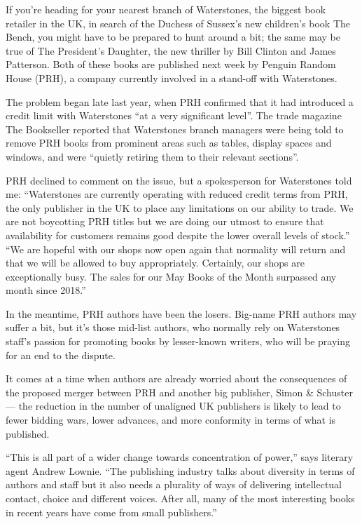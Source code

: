 If you're heading for your nearest branch of Waterstones, the biggest book retailer in the UK, in search of the Duchess of Sussex's new children's book The Bench, you might have to be prepared to hunt around a bit; the same may be true of The President's Daughter, the new thriller by Bill Clinton and James Patterson. Both of these books are published next week by Penguin Random House (PRH), a company currently involved in a stand-off with Waterstones.

The problem began late last year, when PRH confirmed that it had introduced a credit limit with Waterstones ``at a very significant level''. The trade magazine The Bookseller reported that Waterstones branch managers were being told to remove PRH books from prominent areas such as tables, display spaces and windows, and were ``quietly retiring them to their relevant sections''.

PRH declined to comment on the issue, but a spokesperson for Waterstones told me: ``Waterstones are currently operating with reduced credit terms from PRH, the only publisher in the UK to place any limitations on our ability to trade. We are not boycotting PRH titles but we are doing our utmost to ensure that availability for customers remains good despite the lower overall levels of stock.'' ``We are hopeful with our shops now open again that normality will return and that we will be allowed to buy appropriately. Certainly, our shops are exceptionally busy. The sales for our May Books of the Month surpassed any month since 2018.''

In the meantime, PRH authors have been the losers. Big-name PRH authors may suffer a bit, but it's those mid-list authors, who normally rely on Waterstones staff's passion for promoting books by lesser-known writers, who will be praying for an end to the dispute.

It comes at a time when authors are already worried about the consequences of the proposed merger between PRH and another big publisher, Simon \& Schuster — the reduction in the number of unaligned UK publishers is likely to lead to fewer bidding wars, lower advances, and more conformity in terms of what is published.

``This is all part of a wider change towards concentration of power,'' says literary agent Andrew Lownie. ``The publishing industry talks about diversity in terms of authors and staff but it also needs a plurality of ways of delivering intellectual contact, choice and different voices. After all, many of the most interesting books in recent years have come from small publishers.''

